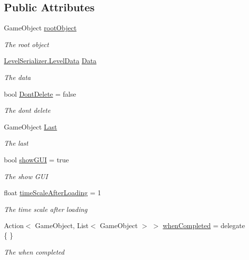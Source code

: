 \subsection*{Public Attributes}
\begin{DoxyCompactItemize}
\item 
Game\+Object \hyperlink{class_level_loader_a8ed3459de6f3a6ba1be8970a0f6ddfc8}{root\+Object}
\begin{DoxyCompactList}\small\item\em The root object \end{DoxyCompactList}\item 
\hyperlink{class_level_serializer_1_1_level_data}{Level\+Serializer.\+Level\+Data} \hyperlink{class_level_loader_a8282d4018064b62c2468d0cb3646f8d3}{Data}
\begin{DoxyCompactList}\small\item\em The data \end{DoxyCompactList}\item 
bool \hyperlink{class_level_loader_a714e188fb9511faaf73917bb4ec05404}{Dont\+Delete} = false
\begin{DoxyCompactList}\small\item\em The dont delete \end{DoxyCompactList}\item 
Game\+Object \hyperlink{class_level_loader_a5adcee44265a6f1e54d2d7f914b26315}{Last}
\begin{DoxyCompactList}\small\item\em The last \end{DoxyCompactList}\item 
bool \hyperlink{class_level_loader_a925df477df93274b0d6565a0978f8c76}{show\+G\+UI} = true
\begin{DoxyCompactList}\small\item\em The show G\+UI \end{DoxyCompactList}\item 
float \hyperlink{class_level_loader_a3f36bc55abdef7cf8d6e42023c8f9397}{time\+Scale\+After\+Loading} = 1
\begin{DoxyCompactList}\small\item\em The time scale after loading \end{DoxyCompactList}\item 
Action$<$ Game\+Object, List$<$ Game\+Object $>$ $>$ \hyperlink{class_level_loader_aa0e135d1e8f6942d593dc7c2ac3769d7}{when\+Completed} = delegate \{ \}
\begin{DoxyCompactList}\small\item\em The when completed \end{DoxyCompactList}\end{DoxyCompactItemize}
